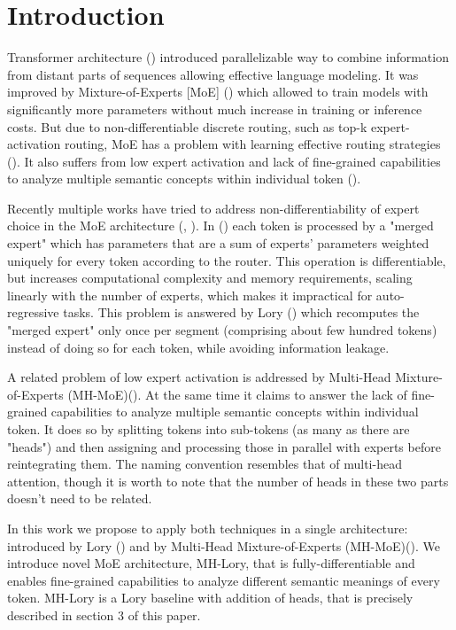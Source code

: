 \documentclass[12pt]{article}
\begin{document}
\section{Introduction}
Transformer architecture (\cite{vaswani2017attention}) introduced parallelizable way to combine information from distant parts of sequences allowing effective language modeling. It was improved by Mixture-of-Experts [MoE] (\cite{shazeer2017outrageously}) which allowed to train models with significantly more parameters without much increase in training or inference costs. But due to non-differentiable discrete routing, such as top-k expert-activation routing, MoE has a problem with learning effective routing strategies (\cite{muqeeth2023soft}). It also suffers from low expert activation and lack of fine-grained capabilities to analyze multiple semantic concepts within individual token (\cite{wu2024multihead}).

Recently multiple works have tried to address non-differentiability of expert choice in the MoE architecture (\cite{Puigcerver2023FromST}, \cite{muqeeth2023soft}). In (\cite{muqeeth2023soft}) each token is processed  by a "merged expert" which has parameters that are a sum of experts' parameters weighted uniquely for every token according to the router. This operation is differentiable, but increases computational complexity and memory requirements, scaling linearly with the number of experts, which makes it impractical for auto-regressive tasks. This problem is answered by Lory (\cite{zhong2024lory}) which recomputes the "merged expert" only once per segment (comprising about few hundred tokens) instead of doing so for each token, while avoiding information leakage.

A related problem of low expert activation is addressed by Multi-Head Mixture-of-Experts (MH-MoE)(\cite{wu2024multihead}). At the same time it claims to answer the lack of fine-grained capabilities to analyze multiple semantic concepts within individual token. 
It does so by splitting tokens into sub-tokens (as many as there are "heads") and then assigning and processing those in parallel with experts before reintegrating them. The naming convention resembles that of multi-head attention, though it is worth to note that the number of heads in these two parts doesn't need to be related.

In this work we propose to apply both techniques in a single architecture: introduced by Lory (\cite{zhong2024lory}) and by Multi-Head Mixture-of-Experts (MH-MoE)(\cite{wu2024multihead}). We introduce novel MoE architecture, MH-Lory, that is fully-differentiable and enables fine-grained capabilities to analyze different semantic meanings of every token. MH-Lory is a Lory baseline with addition of heads, that is precisely described in section 3 of this paper.
\end{document}
